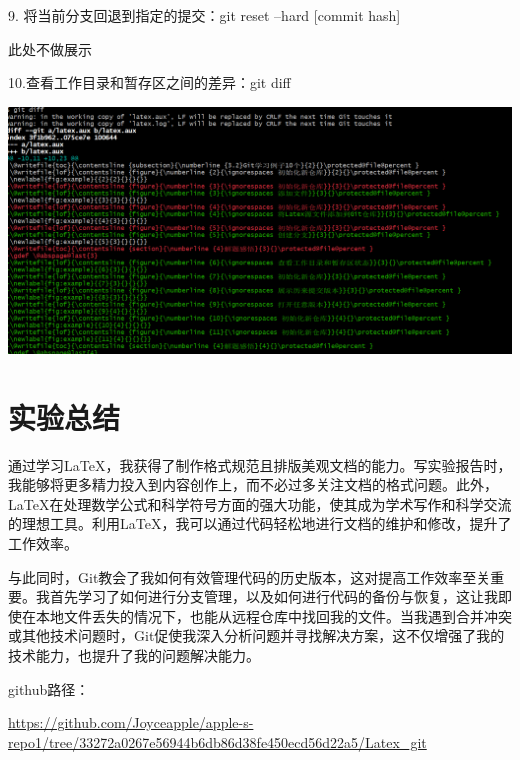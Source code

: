 \documentclass{article}
\begin{document}
	9. 将当前分支回退到指定的提交：git reset --hard [commit hash]
	
	此处不做展示
	
	10.查看工作目录和暂存区之间的差异：git diff
	
	\noindent
	\begin{minipage}{\linewidth}
		\centering
		\includegraphics[width=0.5\linewidth]{example10.png}
		\label{fig:example}
	\end{minipage}
	
	
	
	
	\section{实验总结}
	通过学习LaTeX，我获得了制作格式规范且排版美观文档的能力。写实验报告时，我能够将更多精力投入到内容创作上，而不必过多关注文档的格式问题。此外，LaTeX在处理数学公式和科学符号方面的强大功能，使其成为学术写作和科学交流的理想工具。利用LaTeX，我可以通过代码轻松地进行文档的维护和修改，提升了工作效率。
	
	与此同时，Git教会了我如何有效管理代码的历史版本，这对提高工作效率至关重要。我首先学习了如何进行分支管理，以及如何进行代码的备份与恢复，这让我即使在本地文件丢失的情况下，也能从远程仓库中找回我的文件。当我遇到合并冲突或其他技术问题时，Git促使我深入分析问题并寻找解决方案，这不仅增强了我的技术能力，也提升了我的问题解决能力。
	
	github路径：
	
	\url{https://github.com/Joyceapple/apple-s-repo1/tree/33272a0267e56944b6db86d38fe450ecd56d22a5/Latex_git}
\end{document}
